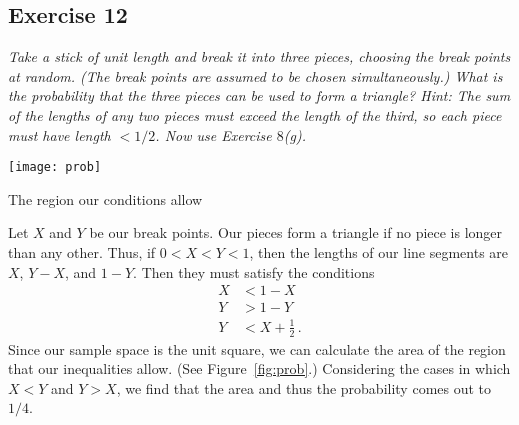 \documentclass{tufte-handout}
\begin{document}
\subsection{Exercise 12}
\begin{description}
\item \emph{Take a stick of unit length and break it into three
    pieces, choosing the break points at random. (The break points are
    assumed to be chosen simultaneously.) What is the probability that
    the three pieces can be used to form a triangle? \emph{Hint}: The
    sum of the lengths of any two pieces must exceed the length of the
    third, so each piece must have length $< 1/2$. Now use Exercise $8$(g).}
\end{description}

\begin{marginfigure}
  \texttt{[image: prob]}
  \caption{The region our conditions allow}
  \label{fig:prob}
\end{marginfigure}

Let $X$ and $Y$ be our break points. Our pieces form a triangle if no
piece is longer than any other. Thus, if $0<X<Y<1$, then the lengths
of our line segments are $X$, $Y-X$, and $1-Y$. Then they must satisfy
the conditions
\begin{align*}
  X &< 1 - X \\
  Y &> 1 - Y \\
  Y &< X + \frac{1}{2} \, .
\end{align*}
Since our sample space is the unit square, we can calculate the area
of the region that our inequalities allow. (See
Figure~\ref{fig:prob}.) Considering the cases in which $X<Y$ and
$Y>X$, we find that the area and thus the probability comes out to
$1/4$.
\end{document}
